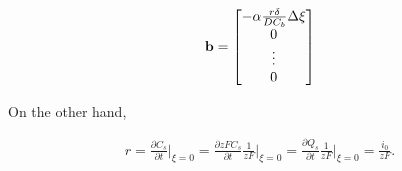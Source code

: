 \begin{align}
    \bf{b} = \begin{bmatrix}
                -\alpha\frac{r\delta}{DC_b} \Delta \xi\\
                0\\
                \vdots \\
                0
                \end{bmatrix}
\end{align}

On the other hand,

\begin{align}
r = \frac{\partial C_s}{\partial t}\bigg|_{\xi = 0} = \frac{\partial zF C_s}{\partial t}\frac{1}{zF}\bigg|_{\xi = 0} = \frac{\partial Q_s}{\partial t}\frac{1}{zF}\bigg|_{\xi = 0} =  \frac{i_0}{zF}.
\end{align}


